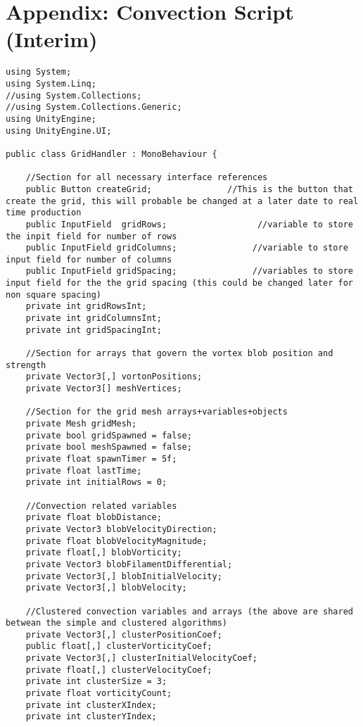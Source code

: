 \section{Appendix: Convection Script (Interim)}

\begin{mdframed}[linecolor=black, topline=true, bottomline=true,
  leftline=false, rightline=false]
\begin{verbatim}
using System;
using System.Linq;
//using System.Collections;
//using System.Collections.Generic;
using UnityEngine;
using UnityEngine.UI;

public class GridHandler : MonoBehaviour {

    //Section for all necessary interface references
    public Button createGrid;               //This is the button that create the grid, this will probable be changed at a later date to real time production
    public InputField  gridRows;                  //variable to store the inpit field for number of rows
    public InputField gridColumns;               //variable to store input field for number of columns
    public InputField gridSpacing;               //variables to store input field for the the grid spacing (this could be changed later for non square spacing)
    private int gridRowsInt;
    private int gridColumnsInt;
    private int gridSpacingInt;

    //Section for arrays that govern the vortex blob position and strength
    private Vector3[,] vortonPositions;
    private Vector3[] meshVertices;

    //Section for the grid mesh arrays+variables+objects
    private Mesh gridMesh;
    private bool gridSpawned = false;
    private bool meshSpawned = false;
    private float spawnTimer = 5f;
    private float lastTime;
    private int initialRows = 0;

    //Convection related variables
    private float blobDistance;
    private Vector3 blobVelocityDirection;
    private float blobVelocityMagnitude;
    private float[,] blobVorticity;
    private Vector3 blobFilamentDifferential;
    private Vector3[,] blobInitialVelocity;
    private Vector3[,] blobVelocity;

    //Clustered convection variables and arrays (the above are shared betwean the simple and clustered algorithms)
    private Vector3[,] clusterPositionCoef;
    public float[,] clusterVorticityCoef;
    private Vector3[,] clusterInitialVelocityCoef;
    private float[,] clusterVelocityCoef;
    private int clusterSize = 3;
    private float vorticityCount;
    private int clusterXIndex;
    private int clusterYIndex;



\end{verbatim}
\end{mdframed}
